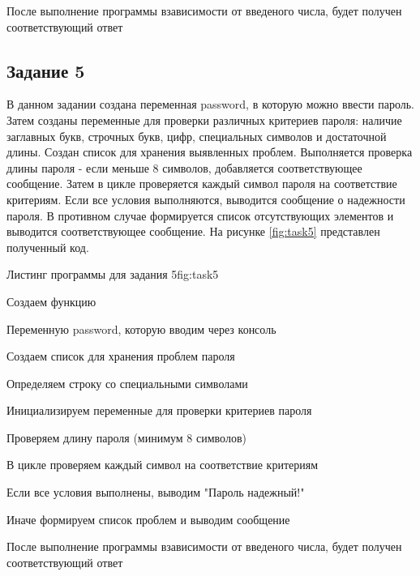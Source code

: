 \documentclass{vvsu}
\begin{document}
После выполнение программы взависимости от введеного числа, будет получен соответствующий ответ

\subsection{Задание 5}
В данном задании создана переменная password, в которую можно ввести пароль. Затем созданы переменные для проверки различных критериев пароля: наличие заглавных букв, строчных букв, цифр, специальных символов и достаточной длины. Создан список для хранения выявленных проблем. Выполняется проверка длины пароля - если меньше 8 символов, добавляется соответствующее сообщение. Затем в цикле проверяется каждый символ пароля на соответствие критериям. Если все условия выполняются, выводится сообщение о надежности пароля. В противном случае формируется список отсутствующих элементов и выводится соответствующее сообщение. На рисунке \ref{fig:task5} представлен полученный код.
\begin{vvsu_figure}{Листинг программы для задания 5}{fig:task5}
    \begin{minipage}{.75\textwidth}
        
    \end{minipage}
\end{vvsu_figure}

\begin{vvsu_list}
\item Создаем функцию
\item Переменную password, которую вводим через консоль
\item Создаем список для хранения проблем пароля
\item Определяем строку  со специальными символами
\item Инициализируем переменные для проверки критериев пароля
\item Проверяем длину пароля (минимум 8 символов)
\item В цикле проверяем каждый символ на соответствие критериям
\item Если все условия выполнены, выводим "Пароль надежный!"
\item Иначе формируем список проблем и выводим сообщение
\end{vvsu_list}


После выполнение программы взависимости от введеного числа, будет получен соответствующий ответ
\end{document}
